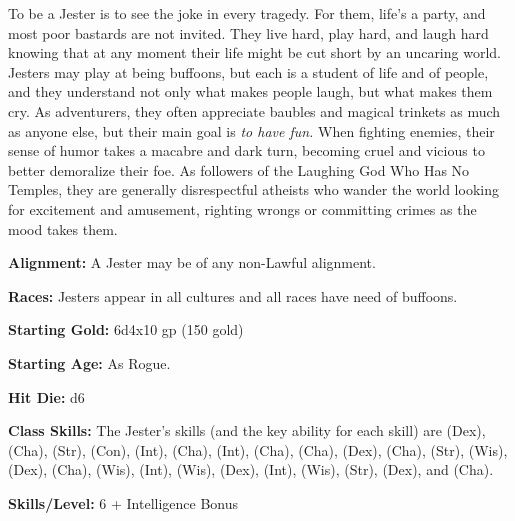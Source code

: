 
To be a Jester is to see the joke in every tragedy. For them, life's a party, and most poor bastards are not invited. They live hard, play hard, and laugh hard knowing that at any moment their life might be cut short by an uncaring world. Jesters may play at being buffoons, but each is a student of life and of people, and they understand not only what makes people laugh, but what makes them cry. As adventurers, they often appreciate baubles and magical trinkets as much as anyone else, but their main goal is \textit{to have fun.} When fighting enemies, their sense of humor takes a macabre and dark turn, becoming cruel and vicious to better demoralize their foe. As followers of the Laughing God Who Has No Temples, they are generally disrespectful atheists who wander the world looking for excitement and amusement, righting wrongs or committing crimes as the mood takes them.

\textbf{Alignment:} A Jester may be of any non-Lawful alignment.

\textbf{Races:} Jesters appear in all cultures and all races have need of buffoons.

\textbf{Starting Gold:} 6d4x10 gp (150 gold)

\textbf{Starting Age:} As Rogue.

\textbf{Hit Die:} d6

\textbf{Class Skills:} The Jester's skills (and the key ability for each skill) are  (Dex),  (Cha),  (Str),  (Con),  (Int),  (Cha),  (Int),  (Cha),  (Cha),  (Dex),  (Cha),  (Str),  (Wis),  (Dex),  (Cha),  (Wis),  (Int),  (Wis),  (Dex),  (Int),  (Wis),  (Str),  (Dex), and  (Cha).

\textbf{Skills/Level:} 6 + Intelligence Bonus

\modebab{}
\poorfor{}
\goodref{}
\poorwil{}

